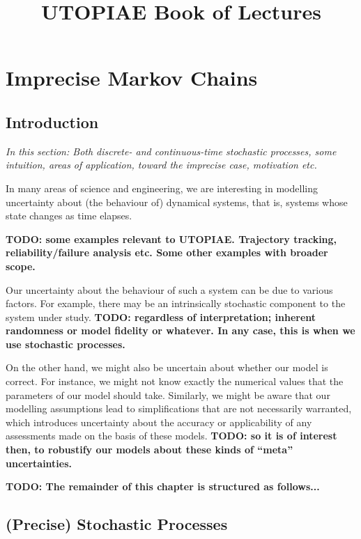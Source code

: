 \documentclass[11pt]{book}
\title{UTOPIAE Book of Lectures}
\author{}
\date{}
\begin{document}
\maketitle

\chapter{Imprecise Markov Chains}

\section{Introduction}

\emph{In this section: Both discrete- and continuous-time stochastic processes, some intuition, areas of application, toward the imprecise case, motivation etc.}
\quad\newline\newline

In many areas of science and engineering, we are interesting in modelling uncertainty about (the behaviour of) dynamical systems, that is, systems whose state changes as time elapses.

{\bf TODO: some examples relevant to UTOPIAE. Trajectory tracking, reliability/failure analysis etc. Some other examples with broader scope.}

Our uncertainty about the behaviour of such a system can be due to various factors. For example, there may be an intrinsically stochastic component to the system under study. {\bf TODO: regardless of interpretation; inherent randomness or model fidelity or whatever. In any case, this is when we use stochastic processes. }


On the other hand, we might also be uncertain about whether our model is correct. For instance, we might not know exactly the numerical values that the parameters of our model should take. Similarly, we might be aware that our modelling assumptions lead to simplifications that are not necessarily warranted, which introduces uncertainty about the accuracy or applicability of any assessments made on the basis of these models. {\bf TODO: so it is of interest then, to robustify our models about these kinds of ``meta'' uncertainties.}

{\bf TODO: The remainder of this chapter is structured as follows...}

\section{(Precise) Stochastic Processes}
\end{document}
